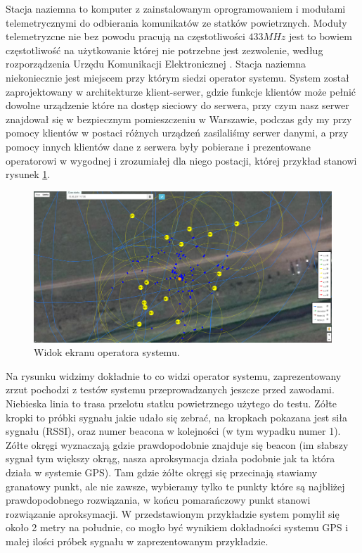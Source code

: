 Stacja naziemna to komputer z zainstalowanym oprogramowaniem i modułami telemetrycznymi do odbierania komunikatów ze statków powietrznych. Moduły telemetryzcne nie bez powodu pracują na częstotliwości $433 MHz$ jest to bowiem częstotliwość na użytkowanie której nie potrzebne jest zezwolenie, według rozporządzenia Urzędu Komunikacji Elektronicznej \cite{rozporzadzenieuke}. Stacja naziemna niekoniecznie jest miejscem przy którym siedzi operator systemu. System został zaprojektowany w architekturze klient-serwer, gdzie funkcje klientów może pełnić dowolne urządzenie które na dostęp sieciowy do serwera, przy czym nasz serwer znajdował się w bezpiecznym pomieszczeniu w Warszawie, podczas gdy my przy pomocy klientów w postaci różnych urządzeń zasilaliśmy serwer danymi, a przy pomocy innych klientów dane z serwera były pobierane i prezentowane operatorowi w wygodnej i zrozumiałej dla niego postacji, której przykład stanowi rysunek \ref{fig:klient}.
\begin{figure}[!th]
    \centering
    \includegraphics[width=15cm]{zalaczniki/obrazy/klient.png}
    \caption{Widok ekranu operatora systemu.}
    \label{fig:klient}
\end{figure}

Na rysunku widzimy dokładnie to co widzi operator systemu, zaprezentowany zrzut pochodzi z testów systemu przeprowadzanych jeszcze przed zawodami. Niebieska linia to trasa przelotu statku powietrznego użytego do testu. Zółte kropki to próbki sygnału jakie udało się zebrać, na kropkach pokazana jest siła sygnału (RSSI), oraz numer beacona w kolejności (w tym wypadku numer 1). Zółte okręgi wyznaczają gdzie prawdopodobnie znajduje się beacon (im słabszy sygnał tym większy okrąg, nasza aproksymacja działa podobnie jak ta która działa w systemie GPS). Tam gdzie żółte okręgi się przecinają stawiamy granatowy punkt, ale nie zawsze, wybieramy tylko te punkty które są najbliżej prawdopodobnego rozwiązania, w końcu pomarańczowy punkt stanowi rozwiązanie aproksymacji. W przedstawionym przykładzie system pomylił się około 2 metry na południe, co mogło być wynikiem dokładności systemu GPS i małej ilości próbek sygnału w zaprezentowanym przykładzie.

